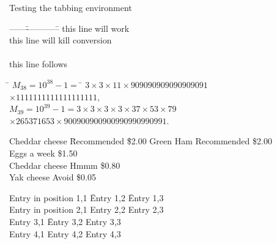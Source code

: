﻿\documentclass{article}
\begin{document}
Testing the tabbing environment

\begin{table}
\begin{center}
\begin{tabbing}
------\= ------------\=\kill
\> this \> line will work \\
\> this \> line will kill conversion \\ \\
\> this \> line follows \\
\end{tabbing}
\end{center}
\end{table}


\begin{table}
\begin{center}
\begin{tabbing}
\hspace*{1cm}\= $M_{38}=10^{38}-1=$ \= $3\times 3 \times 11 \times 909090909090909091$\\
                \>                     \> $\times 1111111111111111111,$\\
                \> $M_{39}= 10^{39}-1= 3 \times 3 \times 3 \times 3 \times 37 \times 53 \times 79$\\ 
                \>                     \> $\times 265371653 \times 900900900900990990990991.$
\end{tabbing}
\end{center}
\end{table}


\begin{table}
\begin{center}
\begin{tabbing}
Cheddar cheese \= Recommended \= \$2.00 \kill
Green Ham \> Recommended \> \$2.00      \\
Eggs  a week \> \$1.50              \\
Cheddar cheese \> Hmmm \> \$0.80        \\
Yak cheese \> Avoid \> \$0.05
\end{tabbing}
\caption{Simplest test case for tabbing environment, should be
three aligned columns}
\end{center}
\end{table}

\begin{table}
\begin{center}
\begin{tabbing}
Entry in position 1,1 \= Entry 1,2 \= Entry 1,3\\
Entry in position 2,1 \> Entry 2,2 \> Entry 2,3\\
Entry 3,1 \= Entry 3,2 \> Entry 3,3            \\
Entry 4,1 \> Entry 4,2 \> Entry 4,3
\end{tabbing}
\caption{Another easy test case for tabbing environment, should be
three aligned columns}
\end{center}
\end{table}
\end{document}
